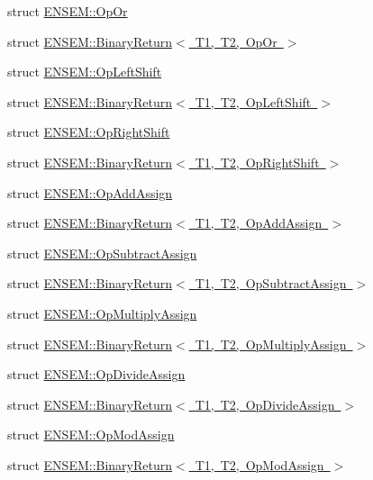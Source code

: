 \begin{DoxyCompactItemize}
\item 
struct \mbox{\hyperlink{structENSEM_1_1OpOr}{E\+N\+S\+E\+M\+::\+Op\+Or}}
\item 
struct \mbox{\hyperlink{structENSEM_1_1BinaryReturn_3_01T1_00_01T2_00_01OpOr_01_4}{E\+N\+S\+E\+M\+::\+Binary\+Return$<$ T1, T2, Op\+Or $>$}}
\item 
struct \mbox{\hyperlink{structENSEM_1_1OpLeftShift}{E\+N\+S\+E\+M\+::\+Op\+Left\+Shift}}
\item 
struct \mbox{\hyperlink{structENSEM_1_1BinaryReturn_3_01T1_00_01T2_00_01OpLeftShift_01_4}{E\+N\+S\+E\+M\+::\+Binary\+Return$<$ T1, T2, Op\+Left\+Shift $>$}}
\item 
struct \mbox{\hyperlink{structENSEM_1_1OpRightShift}{E\+N\+S\+E\+M\+::\+Op\+Right\+Shift}}
\item 
struct \mbox{\hyperlink{structENSEM_1_1BinaryReturn_3_01T1_00_01T2_00_01OpRightShift_01_4}{E\+N\+S\+E\+M\+::\+Binary\+Return$<$ T1, T2, Op\+Right\+Shift $>$}}
\item 
struct \mbox{\hyperlink{structENSEM_1_1OpAddAssign}{E\+N\+S\+E\+M\+::\+Op\+Add\+Assign}}
\item 
struct \mbox{\hyperlink{structENSEM_1_1BinaryReturn_3_01T1_00_01T2_00_01OpAddAssign_01_4}{E\+N\+S\+E\+M\+::\+Binary\+Return$<$ T1, T2, Op\+Add\+Assign $>$}}
\item 
struct \mbox{\hyperlink{structENSEM_1_1OpSubtractAssign}{E\+N\+S\+E\+M\+::\+Op\+Subtract\+Assign}}
\item 
struct \mbox{\hyperlink{structENSEM_1_1BinaryReturn_3_01T1_00_01T2_00_01OpSubtractAssign_01_4}{E\+N\+S\+E\+M\+::\+Binary\+Return$<$ T1, T2, Op\+Subtract\+Assign $>$}}
\item 
struct \mbox{\hyperlink{structENSEM_1_1OpMultiplyAssign}{E\+N\+S\+E\+M\+::\+Op\+Multiply\+Assign}}
\item 
struct \mbox{\hyperlink{structENSEM_1_1BinaryReturn_3_01T1_00_01T2_00_01OpMultiplyAssign_01_4}{E\+N\+S\+E\+M\+::\+Binary\+Return$<$ T1, T2, Op\+Multiply\+Assign $>$}}
\item 
struct \mbox{\hyperlink{structENSEM_1_1OpDivideAssign}{E\+N\+S\+E\+M\+::\+Op\+Divide\+Assign}}
\item 
struct \mbox{\hyperlink{structENSEM_1_1BinaryReturn_3_01T1_00_01T2_00_01OpDivideAssign_01_4}{E\+N\+S\+E\+M\+::\+Binary\+Return$<$ T1, T2, Op\+Divide\+Assign $>$}}
\item 
struct \mbox{\hyperlink{structENSEM_1_1OpModAssign}{E\+N\+S\+E\+M\+::\+Op\+Mod\+Assign}}
\item 
struct \mbox{\hyperlink{structENSEM_1_1BinaryReturn_3_01T1_00_01T2_00_01OpModAssign_01_4}{E\+N\+S\+E\+M\+::\+Binary\+Return$<$ T1, T2, Op\+Mod\+Assign $>$}}

\end{DoxyCompactItemize}
